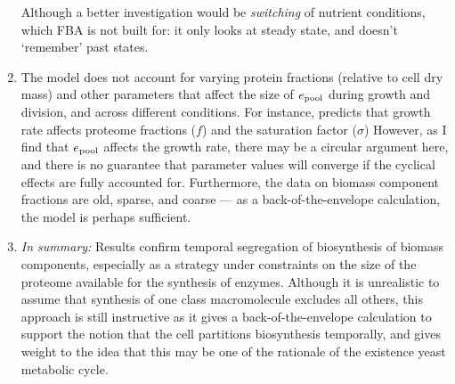\begin{enumerate}
        Although a better investigation would be \emph{switching} of nutrient conditions, which FBA is not built for: it only looks at steady state, and doesn't `remember' past states.
  \item The model does not account for varying protein fractions (relative to cell dry mass) and other parameters that affect the size of $e_{\mathrm{pool}}$ during growth and division, and across different conditions.
        For instance, \parencite{elsemmanWholecellModelingYeast2022} predicts that growth rate affects proteome fractions ($f$) and the saturation factor ($\sigma$)
        However, as I find that $e_{\mathrm{pool}}$ affects the growth rate, there may be a circular argument here, and there is no guarantee that parameter values will converge if the cyclical effects are fully accounted for.
        Furthermore, the data on biomass component fractions are old, sparse, and coarse --- as a back-of-the-envelope calculation, the model is perhaps sufficient.
  \item \emph{In summary:} Results confirm temporal segregation of biosynthesis of biomass components, especially as a strategy under constraints on the size of the proteome available for the synthesis of enzymes.
        Although it is unrealistic to assume that synthesis of one class macromolecule excludes all others, this approach is still instructive as it gives a back-of-the-envelope calculation to support the notion that the cell partitions biosynthesis temporally, and gives weight to the idea that this may be one of the rationale of the existence yeast metabolic cycle.
\end{enumerate}

